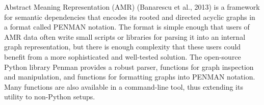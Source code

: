 Abstract Meaning Representation (AMR) (Banarescu et al., 2013) is a framework for semantic dependencies that encodes its rooted and directed acyclic graphs in a format called PENMAN notation. The format is simple enough that users of AMR data often write small scripts or libraries for parsing it into an internal graph representation, but there is enough complexity that these users could benefit from a more sophisticated and well-tested solution. The open-source Python library Penman provides a robust parser, functions for graph inspection and manipulation, and functions for formatting graphs into PENMAN notation. Many functions are also available in a command-line tool, thus extending its utility to non-Python setups.
